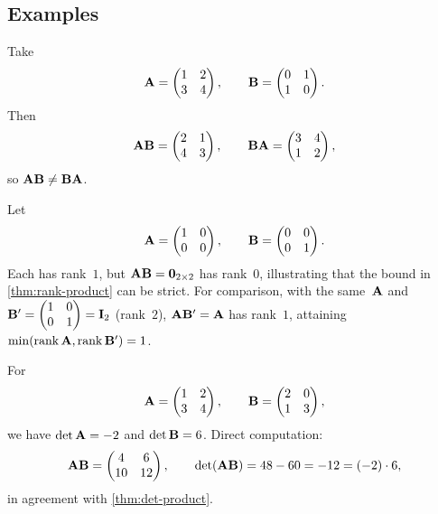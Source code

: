 \subsection*{Examples}

\begin{example}
\label{ex:noncomm-mult}
Take
\[
  \mathbf{A} = \begin{pmatrix} 1 & 2 \\ 3 & 4 \end{pmatrix}, \qquad
  \mathbf{B} = \begin{pmatrix} 0 & 1 \\ 1 & 0 \end{pmatrix}.
\]
Then
\[
  \mathbf{A}\mathbf{B} = \begin{pmatrix} 2 & 1 \\ 4 & 3 \end{pmatrix}, \qquad
  \mathbf{B}\mathbf{A} = \begin{pmatrix} 3 & 4 \\ 1 & 2 \end{pmatrix},
\]
so $\mathbf{A}\mathbf{B} \neq \mathbf{B}\mathbf{A}$.
\end{example}

\begin{example}
\label{ex:rank-product-drop}
Let
\[
  \mathbf{A} = \begin{pmatrix} 1 & 0 \\ 0 & 0 \end{pmatrix}, \qquad
  \mathbf{B} = \begin{pmatrix} 0 & 0 \\ 0 & 1 \end{pmatrix}.
\]
Each has rank~$1$, but $\mathbf{A}\mathbf{B} = \mathbf{0}_{2 \times 2}$ has
rank~$0$, illustrating that the bound in \cref{thm:rank-product} can
be strict. For comparison, with the same~$\mathbf{A}$ and
$\mathbf{B}' = \begin{pmatrix} 1 & 0 \\ 0 & 1 \end{pmatrix} = \mathbf{I}_2$
(rank~$2$), $\mathbf{A}\mathbf{B}' = \mathbf{A}$ has rank~$1$, attaining
$\min(\operatorname{rank} \mathbf{A}, \operatorname{rank} \mathbf{B}') = 1$.
\end{example}

\begin{example}
\label{ex:det-product}
For
\[
  \mathbf{A} = \begin{pmatrix} 1 & 2 \\ 3 & 4 \end{pmatrix}, \qquad
  \mathbf{B} = \begin{pmatrix} 2 & 0 \\ 1 & 3 \end{pmatrix},
\]
we have $\det \mathbf{A} = -2$ and $\det \mathbf{B} = 6$. Direct computation:
\[
  \mathbf{A}\mathbf{B} = \begin{pmatrix} 4 & 6 \\ 10 & 12 \end{pmatrix},
  \qquad \det(\mathbf{A}\mathbf{B}) = 48 - 60 = -12 = (-2) \cdot 6,
\]
in agreement with \cref{thm:det-product}.
\end{example}

